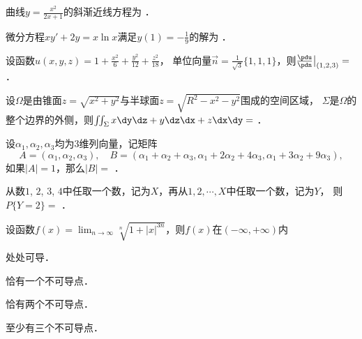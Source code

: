 \documentclass[plain,noanswer,medmath]{../../template/jnuexam}
\begin{document}




\begin{problem}
曲线$y = \frac{x^2}{2x + 1}$的斜渐近线方程为 \fillin{}．
\end{problem}


\begin{problem}
微分方程$xy' + 2y = x\ln x$满足$y(1) = - \frac{1}{9}$的解为 \fillin{}．
\end{problem}


\begin{problem}
设函数$u(x,y,z) = 1 + \frac{x^2}{6} + \frac{y^2}{12} + \frac{z^2}{18}$，
单位向量$\vec{n} = \frac{1}{\sqrt{3}}\{1,1,1\}$，则$\frac{\pdu}{\pdn}\big|_{(1,2,3)} =$ \fillin{}．
\end{problem}


\begin{problem}
设$\Omega$是由锥面$z = \sqrt{x^2 + y^2}$与半球面$z = \sqrt{R^2 - x^2 - y^2}$围成的空间区域，
$\Sigma$是$\Omega$的整个边界的外侧，则$\iint_{\Sigma}x\dy\dz + y\dz\dx + z\dx\dy =$ \fillin{}．
\end{problem}


\begin{problem}
设$\alpha_1,\alpha_2,\alpha_3$均为3维列向量，记矩阵
$$A = (\alpha_1,\alpha_2,\alpha_3),\quad
  B = (\alpha_1 + \alpha_2 + \alpha_3,\alpha_1 + 2\alpha_2 + 4\alpha_3,\alpha_1 + 3\alpha_2 + 9\alpha_3),$$
如果$|A| = 1$，那么$|B| =$ \fillin{}．
\end{problem}


\begin{problem}
从数$1$, $2$, $3$, $4$中任取一个数，记为$X$，再从$1,2, \cdots ,X$中任取一个数，记为$Y$，
则$P\{Y = 2\} =$ \fillin{}．
\end{problem}




\begin{problem}
设函数$f(x) = \lim_{n \to \infty} \sqrt[n]{1+|x|^{3n}}$，则$f(x)$在$(-\infty , +\infty)$内\pickout{}
\begin{abcd}
\item 处处可导．
\item 恰有一个不可导点．
\item 恰有两个不可导点．
\item 至少有三个不可导点．
\end{abcd}
\end{problem}
\end{document}
